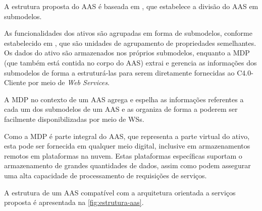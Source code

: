 A estrutura proposta do AAS é baseada em , que estabelece a divisão do AAS em submodelos.




As funcionalidades dos ativos são agrupadas em forma de submodelos, conforme estabelecido em , que são unidades de agrupamento de propriedades semelhantes. Os dados do ativo são armazenados nos próprios submodelos, enquanto a MDP (que também está contida no corpo do AAS) extrai e gerencia as informações dos submodelos de forma a estruturá-las para serem diretamente fornecidas ao C4.0-Cliente por meio de \textit{Web Services}.

A MDP no contexto de um AAS agrega e espelha as informações referentes a cada um dos submodelos de um AAS e as organiza de forma a poderem ser facilmente disponibilizadas por meio de WSs.

Como a MDP é parte integral do AAS, que representa a parte virtual do ativo, esta pode ser fornecida em qualquer meio digital, inclusive em armazenamentos remotos em plataformas na nuvem. Estas plataformas específicas suportam o armazenamento de grandes quantidades de dados, assim como podem assegurar uma alta capacidade de processamento de requisições de serviços.

A estrutura de um AAS compatível com a arquitetura orientada a serviços proposta é apresentada na \autoref{fig:estrutura-aas}.

